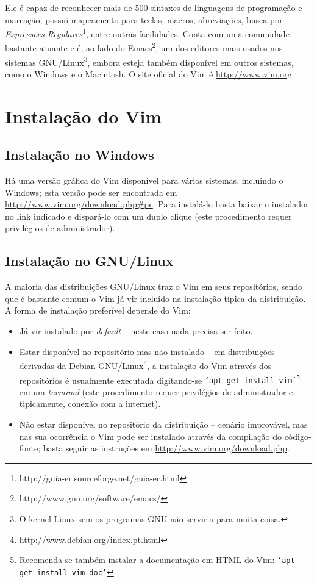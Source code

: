 \documentclass[10pt,a4paper,openany]{book}
\begin{document}
Ele é capaz de reconhecer mais de 500 sintaxes de linguagens de programação e
marcação, possui mapeamento para teclas, macros, abreviações, busca por
{\em{Expressões
Regulares}}\footnote{http://guia-er.sourceforge.net/guia-er.html}, entre
outras facilidades. Conta com uma comunidade bastante atuante e é, ao lado do
Emacs\footnote{http://www.gnu.org/software/emacs/}, um dos editores mais usados
nos sistemas GNU/Linux\footnote{O kernel Linux sem os programas GNU não
serviria para muita coisa.}, embora esteja também disponível em outros sistemas,
como o Windows e o Macintosh. O site oficial do Vim é \url{http://www.vim.org}.

\section{Instalação do Vim}

\subsection{Instalação no Windows}

Há uma versão gráfica do Vim disponível para vários sistemas, incluindo o Windows;
esta versão pode ser encontrada em \url{http://www.vim.org/download.php#pc}. 
Para instalá-lo basta baixar o instalador no link indicado e dispará-lo com um
duplo clique (este procedimento requer privilégios de administrador).

\subsection{Instalação no GNU/Linux}

A maioria das distribuições GNU/Linux traz o Vim em seus repositórios, sendo
que é bastante comum o Vim já vir incluído na instalação típica da distribuição.
A forma de instalação preferível depende do Vim:
\begin{itemize}
\item Já vir instalado por {\em default} -- neste caso nada precisa ser feito.

\item Estar disponível no repositório mas não instalado -- em distribuições
derivadas da Debian GNU/Linux\footnote{http://www.debian.org/index.pt.html},
a instalação do Vim através dos repositórios é usualmente executada
digitando-se {\tt `apt-get install vim'}\footnote{Recomenda-se também instalar
a documentação em HTML do Vim: {\tt `apt-get install vim-doc'}} em um {\em terminal} (este procedimento
requer privilégios de administrador e, tipicamente, conexão com a internet).

\item Não estar disponível no repositório da distribuição -- cenário
improvável, mas
nas sua ocorrência o Vim pode ser instalado através da compilação do
código-fonte; basta seguir as instruções em \url{http://www.vim.org/download.php}.

\end{itemize}
\end{document}
